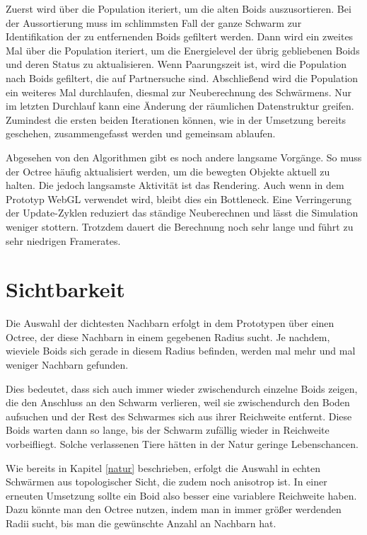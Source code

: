 \documentclass[draft=false
              ,paper=a4
              ,twoside=false
              ,fontsize=11pt
              ,headsepline
              ,BCOR10mm
              ,DIV11
              ,bibtotoc
              ,liststotoc
              ]{scrbook}
\begin{document}
Zuerst wird über die Population iteriert, um die alten Boids auszusortieren. Bei der Aussortierung muss im schlimmsten Fall der ganze Schwarm zur Identifikation der zu entfernenden Boids gefiltert werden. Dann wird ein zweites Mal über die Population iteriert, um die Energielevel der übrig gebliebenen Boids und deren Status zu aktualisieren. Wenn Paarungszeit ist, wird die Population nach Boids gefiltert, die auf Partnersuche sind. Abschließend wird die Population ein weiteres Mal durchlaufen, diesmal zur Neuberechnung des Schwärmens. Nur im letzten Durchlauf kann eine Änderung der räumlichen Datenstruktur greifen. Zumindest die ersten beiden Iterationen können, wie in der Umsetzung bereits geschehen, zusammengefasst werden und gemeinsam ablaufen.

Abgesehen von den Algorithmen gibt es noch andere langsame Vorgänge. So muss der Octree häufig aktualisiert werden, um die bewegten Objekte aktuell zu halten. Die jedoch langsamste Aktivität ist das Rendering. Auch wenn in dem Prototyp WebGL verwendet wird, bleibt dies ein Bottleneck. Eine Verringerung der Update-Zyklen reduziert das ständige Neuberechnen und lässt die Simulation weniger stottern. Trotzdem dauert die Berechnung noch sehr lange und führt zu sehr niedrigen Framerates.

\section{Sichtbarkeit}
Die Auswahl der dichtesten Nachbarn erfolgt in dem Prototypen über einen Octree, der diese Nachbarn in einem gegebenen Radius sucht. Je nachdem, wieviele Boids sich gerade in diesem Radius befinden, werden mal mehr und mal weniger Nachbarn gefunden.

Dies bedeutet, dass sich auch immer wieder zwischendurch einzelne Boids zeigen, die den Anschluss an den Schwarm verlieren, weil sie zwischendurch den Boden aufsuchen und der Rest des Schwarmes sich aus ihrer Reichweite entfernt. Diese Boids warten dann so lange, bis der Schwarm zufällig wieder in Reichweite vorbeifliegt. Solche verlassenen Tiere hätten in der Natur geringe Lebenschancen.

Wie bereits in Kapitel \ref{natur} beschrieben, erfolgt die Auswahl in echten Schwärmen aus topologischer Sicht, die zudem noch anisotrop ist. In einer erneuten Umsetzung sollte ein Boid also besser eine variablere Reichweite haben. Dazu könnte man den Octree nutzen, indem man in immer größer werdenden Radii sucht, bis man die gewünschte Anzahl an Nachbarn hat.
\end{document}
